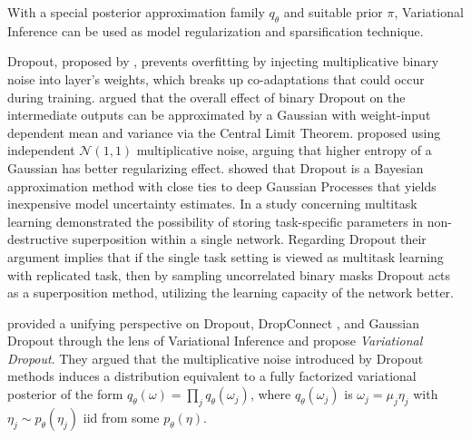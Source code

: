 \documentclass[a4paper,10pt,twocolumn]{article}
\begin{document}
With a special posterior approximation family $q_\theta$ and suitable prior $\pi$,
Variational Inference can be used as model regularization and sparsification technique.

Dropout, proposed by \citet{hinton_improving_2012}, prevents overfitting by injecting
multiplicative binary noise into layer's weights, which breaks up co-adaptations that
could occur during training. \citet{wang_fast_2013} argued that the overall effect of
binary Dropout on the intermediate outputs can be approximated by a Gaussian with weight-input
dependent mean and variance via the Central Limit Theorem. \citet{srivastava_dropout_2014}
proposed using independent $\mathcal{N}(1, 1)$ multiplicative noise, arguing that higher
entropy of a Gaussian has better regularizing effect. \citet{gal_dropout_2016} showed
that Dropout is a Bayesian approximation method with close ties to deep Gaussian Processes
that yields inexpensive model uncertainty estimates. In a study concerning multitask learning
\citet{cheung_superposition_2019} demonstrated the possibility of storing task-specific
parameters in non-destructive superposition within a single network. Regarding Dropout
their argument implies that if the single task setting is viewed as multitask learning
with replicated task, then by sampling uncorrelated binary masks Dropout acts as a
superposition method, utilizing the learning capacity of the network better.

%
\citet{kingma_variational_2015} provided a unifying perspective on Dropout, DropConnect
\citep{wan_regularization_2013}, and Gaussian Dropout \citep{wang_fast_2013} through
the lens of Variational Inference and propose \emph{Variational Dropout}. They argued
that the multiplicative noise introduced by Dropout methods induces a distribution
equivalent to a fully factorized variational posterior of the form $
  q_\theta(\omega) = \prod_j q_{\theta}(\omega_j)
$, where $q_{\theta}(\omega_j)$ is $\omega_j = \mu_j \eta_j$ with $
  \eta_j \sim p_\theta(\eta_j)
$ iid from some $p_\theta(\eta)$.
%
\end{document}
